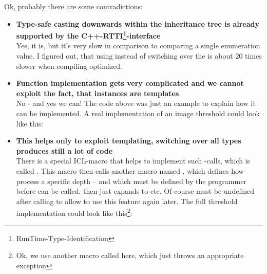 
Ok, probably there are some contradictions:\\

\begin{itemize}
\item \textbf{Type-safe casting downwards within the inheritance tree is already supported by the C++-RTTI\footnote{RunTime-Type-Identification}-interface}\\
Yes, it is, but it's very slow in comparison to comparing a single enumeration value. I figured out, that using  instead of switching over the  is about 20 times slower when compiling optimized.

\item \textbf{Function implementation gets very complicated and we cannot exploit the fact, that  instances are templates}\\
No - and yes we can! The code above was just an example to explain how it can be implemented. A real implementation of an image threshold could look like this:


\item \textbf{This helps only to exploit templating, switching over all types produces still a lot of code}\\
There is a special ICL-macro that helps to implement such -calls, which is called . This macro then calls another macro named , which defines how process a specific depth -- and which must be defined by the programmer before  can be called.  then just expands to    etc. Of course  must be undefined after calling  to allow to use this feature again later. The full threshold implementation could look like this\footnote{Ok, we use another macro called  here, which just throws an appropriate exception}:


\end{itemize}

